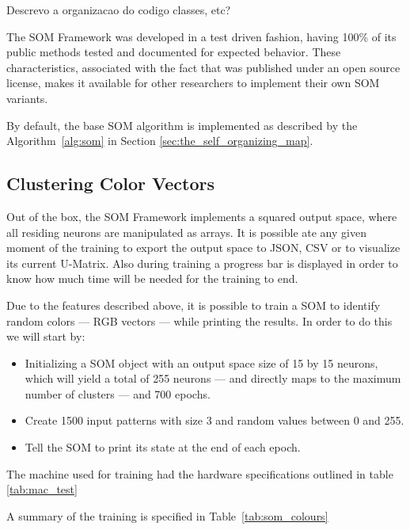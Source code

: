 {\color{red} Descrevo a organizacao do codigo classes, etc? }

The \ac{SOM} Framework was developed in a test driven fashion, having 100\% of its public methods tested and documented for expected behavior. These characteristics, associated with the fact that was published under an open source license, makes it available for other researchers to implement their own SOM variants.

By default, the base SOM algorithm is implemented as described by the Algorithm~\ref{alg:som} in Section \ref{sec:the_self_organizing_map}. 
\subsection{Clustering Color Vectors}
\label{sub:main_features}
Out of the box, the \ac{SOM} Framework implements a squared output space, where all residing neurons are manipulated as arrays. It is possible ate any given moment of the training to export the output space to \ac{JSON}, \ac{CSV} or to visualize its current \ac{U-Matrix}. Also during training a progress bar is displayed in order to know how much time will be needed for the training to end.

Due to the features described above, it is possible to train a \ac{SOM} to identify random colors --- RGB vectors --- while printing the results. In order to do this we will start by:
\begin{itemize}
  \item Initializing a SOM object with an output space size of 15 by 15 neurons, which will yield a total of 255 neurons --- and directly maps to the maximum number of clusters --- and 700 epochs.
  \item Create 1500 input patterns with size 3 and random values between 0 and 255. 
  \item Tell the SOM to print its state at the end of each epoch.
\end{itemize}
The machine used for training had the hardware specifications outlined in table \ref{tab:mac_test}



A summary of the training is specified in Table~\ref{tab:som_colours}


